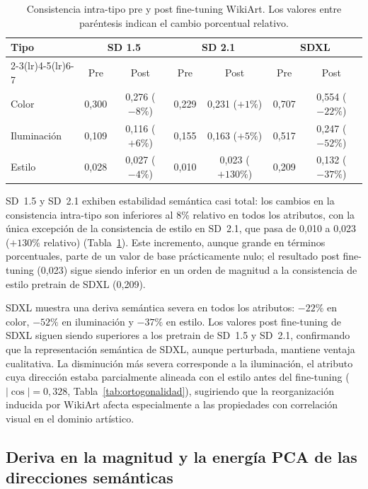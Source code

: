 \documentclass[12pt, a4paper, twoside]{book}
\begin{document}
\begin{table}[htb]
\centering
\caption{Consistencia intra-tipo pre y post fine-tuning WikiArt. Los valores entre
paréntesis indican el cambio porcentual relativo.}
\label{tab:deriva_semantica_consistencia}
\small
\begin{tabular}{lcccccc}
\toprule
\textbf{Tipo} & \multicolumn{2}{c}{\textbf{SD 1.5}} & \multicolumn{2}{c}{\textbf{SD 2.1}} &
\multicolumn{2}{c}{\textbf{SDXL}} \\
\cmidrule(lr){2-3}\cmidrule(lr){4-5}\cmidrule(lr){6-7}
 & Pre & Post & Pre & Post & Pre & Post \\
\midrule
Color       & 0,300 & 0,276 {\small($-8\%$)}   & 0,229 & 0,231 {\small($+1\%$)}   &
0,707 & 0,554 {\small($-22\%$)} \\
Iluminación & 0,109 & 0,116 {\small($+6\%$)}   & 0,155 & 0,163 {\small($+5\%$)}   &
0,517 & 0,247 {\small($-52\%$)} \\
Estilo      & 0,028 & 0,027 {\small($-4\%$)}   & 0,010 & 0,023 {\small($+130\%$)} &
0,209 & 0,132 {\small($-37\%$)} \\
\bottomrule
\end{tabular}
\end{table}

SD~1.5 y SD~2.1 exhiben estabilidad semántica casi total: los cambios en la consistencia
intra-tipo son inferiores al 8\% relativo en todos los atributos, con la única excepción de la
consistencia de estilo en SD~2.1, que pasa de 0,010 a 0,023 ($+130\%$ relativo)
(Tabla~\ref{tab:deriva_semantica_consistencia}).
Este incremento, aunque grande en términos porcentuales, parte de un valor de base prácticamente
nulo; el resultado post fine-tuning (0,023) sigue siendo inferior en un orden de magnitud a la
consistencia de estilo pretrain de SDXL (0,209).

SDXL muestra una deriva semántica severa en todos los atributos: $-22\%$ en color, $-52\%$
en iluminación y $-37\%$ en estilo. Los valores post fine-tuning de SDXL siguen siendo
superiores a los pretrain de SD~1.5 y SD~2.1, confirmando que la representación semántica
de SDXL, aunque perturbada, mantiene ventaja cualitativa. La disminución más severa
corresponde a la iluminación, el atributo cuya dirección estaba parcialmente alineada con
el estilo antes del fine-tuning ($|\cos| = 0{,}328$, Tabla~\ref{tab:ortogonalidad}), sugiriendo
que la reorganización inducida por WikiArt afecta especialmente a las propiedades con
correlación visual en el dominio artístico.

\subsection{Deriva en la magnitud y la energía PCA de las direcciones semánticas}
\label{subsec:res:deriva_normas_energia}
\end{document}
